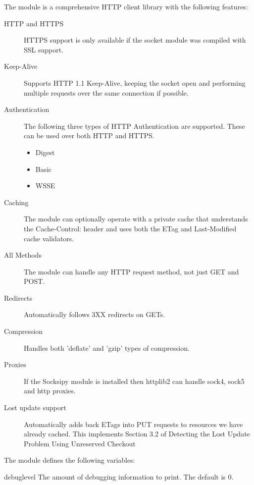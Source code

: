 The  module is a comprehensive HTTP client library with the following features:

\begin{description}
\item[HTTP and HTTPS]  HTTPS support is only available if the socket module was compiled with SSL support. 
\item[Keep-Alive]    Supports HTTP 1.1 Keep-Alive, keeping the socket open and performing multiple requests over the same connection if possible. 
\item[Authentication] The following three types of HTTP Authentication are supported. These can be used over both HTTP and HTTPS.
    \begin{itemize}
        \item Digest
        \item Basic
        \item WSSE
    \end{itemize}
\item[Caching]
    The module can optionally operate with a private cache that understands the Cache-Control: header and uses both the ETag and Last-Modified cache validators. 
\item[All Methods]
    The module can handle any HTTP request method, not just GET and POST.
\item[Redirects]
    Automatically follows 3XX redirects on GETs.
\item[Compression]
    Handles both 'deflate' and 'gzip' types of compression.
\item[Proxies]
    If the Socksipy module is installed then httplib2 can handle sock4, sock5 and http proxies.
\item[Lost update support]
    Automatically adds back ETags into PUT requests to resources we have already cached. This implements Section 3.2 of Detecting the Lost Update Problem Using Unreserved Checkout
\end{description}


The  module defines the following variables:

\begin{datadesc}{debuglevel}
The amount of debugging information to print. The default is 0.
\end{datadesc}

